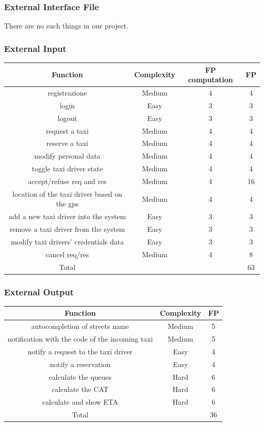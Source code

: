 \documentclass{article}
\begin{document}
\subsubsection{External Interface File}
There are no such things in our project.
\subsubsection{External Input}
\begin{table}[H]
\begin{adjustbox}{width=1.2\textwidth}
\begin{tabular}{*{4}{c}}
\toprule
Function & Complexity & FP computation & FP \\
\midrule
registrazione & Medium & 4 & 4\\
login & Easy & 3 & 3\\
logout & Easy & 3 & 3\\
request a taxi & Medium & 4 & 4\\
reserve a taxi & Medium & 4 & 4\\
modify personal data & Medium & 4 & 4\\
toggle taxi driver state & Medium & 4 & 4\\
accept/refuse req and res & Medium \texttimes 4 & 4 \texttimes 4 &  16\\
location of the taxi driver based on the gps & Medium & 4 & 4\\
add a new taxi driver into the system & Easy & 3 & 3 \\
remove a taxi driver from the system & Easy & 3 & 3 \\
modify taxi drivers' credentials data & Easy & 3 & 3 \\
cancel req/res & Medium \texttimes 2 & 4 \texttimes 2 & 8 \\
\midrule
Total & & & 63\\
\bottomrule
\end{tabular}
\end{adjustbox}
\end{table}
\subsubsection{External Output}
\begin{table}[H]
\begin{adjustbox}{width=1.2\textwidth}
\begin{tabular}{*{3}{c}}
\toprule
Function & Complexity & FP \\
\midrule
	autocompletion of streets name & Medium &5\\ 
	notification with the code of the incoming taxi& Medium&5\\ 
	notify a request to the taxi driver&Easy&4\\ 
	notify a reservation&Easy&4\\ 
	calculate the queues &Hard&6\\ 
	calculate the CAT&Hard&6\\ 
	calculate and show ETA&Hard&6\\ 
\midrule
Total & & 36\\
\bottomrule
\end{tabular}
\end{adjustbox}
\end{table}
\end{document}
